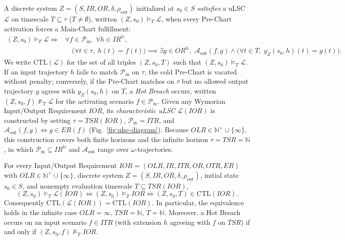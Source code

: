 A discrete system $Z = (S, IR, OR, \delta, \rho_{\text{out}})$ initialized at $s_0 \in S$ \emph{satisfies} a uLSC $\mathcal{L}$ on timescale $T \subseteq \tau$ ($T \neq \emptyset$), written $(Z, s_0) \models_T \mathcal{L}$, when every Pre-Chart activation forces a Main-Chart fulfillment:
\begin{equation}
\begin{aligned}
    (Z, s_0) \models_T \mathcal{L}
    \iff{}&
    \forall f \in \mathcal{P}_{\text{in}},\; \forall h \in IR^{\mathbb{N}},\\
    &\quad\big(\forall t \in \tau,\; h(t) = f(t)\big) \implies \exists g \in OR^{\mathbb{N}},\; \mathcal{A}_{\text{out}}(f, g) \wedge \big(\forall t \in T,\; y_Z(s_0, h)(t) = g(t)\big).
\end{aligned}
    \label{eq:lsc-sat}
\end{equation}
We write $\mathrm{CTL}(\mathcal{L})$ for the set of all triples $(Z, s_0, T)$ such that $(Z, s_0) \models_T \mathcal{L}$.  If an input trajectory $h$ fails to match $\mathcal{P}_{\text{in}}$ on $\tau$, the cold Pre-Chart is vacated without penalty; conversely, if the Pre-Chart matches on $\tau$ but no allowed output trajectory $g$ agrees with $y_Z(s_0, h)$ on $T$, a \emph{Hot Breach} occurs, written $(Z, s_0, f) \not\models_T \mathcal{L}$ for the activating scenario $f \in \mathcal{P}_{\text{in}}$.  Given any Wymorian Input/Output Requirement $IOR$, its \emph{characteristic uLSC} $\mathcal{L}(IOR)$ is constructed by setting $\tau = TSR(IOR)$, $\mathcal{P}_{\text{in}} = ITR$, and $\mathcal{A}_{\text{out}}(f, g) \Longleftrightarrow g \in ER(f)$ (Fig.~\ref{fig:ulsc-diagram}).  Because $OLR \in \mathbb{N}^+ \cup \{\infty\}$, this construction covers both finite horizons and the infinite horizon $\tau = TSR = \mathbb{N}$, in which $\mathcal{P}_{\text{in}} \subseteq IR^{\mathbb{N}}$ and $\mathcal{A}_{\text{out}}$ range over $\omega$-trajectories.

\begin{theorem} \label{thm:ior-lsc}
For every Input/Output Requirement $IOR = (OLR, IR, ITR, OR, OTR, ER)$ with $OLR \in \mathbb{N}^+ \cup \{\infty\}$, discrete system $Z = (S, IR, OR, \delta, \rho_{\text{out}})$, initial state $s_0 \in S$, and nonempty evaluation timescale $T \subseteq TSR(IOR)$,
\begin{equation}
    (Z, s_0) \models_T \mathcal{L}(IOR)
    \iff (Z, s_0) \models_T IOR
    \iff (Z, s_0, T) \in \mathrm{CTL}(IOR).
    \label{eq:ior-lsc-equiv}
\end{equation}
Consequently $\mathrm{CTL}(\mathcal{L}(IOR)) = \mathrm{CTL}(IOR)$.  In particular, the equivalence holds in the infinite case $OLR = \infty$, $TSR = \mathbb{N}$, $T = \mathbb{N}$.  Moreover, a Hot Breach occurs on an input scenario $f \in ITR$ (with extension $h$ agreeing with $f$ on $TSR$) if and only if $(Z, s_0, f) \not\models_T IOR$.
\end{theorem}

